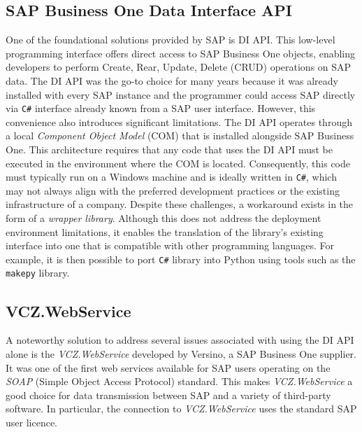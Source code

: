 \subsection{SAP Business One Data Interface API}
\label{subsec:sap-b1-di-api}

One of the foundational solutions provided by SAP is \ac{DI API}.
This low-level programming interface offers direct access to SAP Business One objects, enabling developers to perform Create, Rear, Update, Delete (\ac{CRUD}) operations on SAP data. 
The \ac{DI API} was the go-to choice for many years because it was already installed with every SAP instance and the programmer could access SAP directly via \texttt{C\#} interface already known from a SAP user interface.
However, this convenience also introduces significant limitations.
The \ac{DI API} operates through a local \textit{Component Object Model} (COM) that is installed alongside SAP Business One.
This architecture requires that any code that uses the DI API must be executed in the environment where the COM is located.
Consequently, this code must typically run on a Windows machine and is ideally written in \texttt{C\#}, which may not always align with the preferred development practices or the existing infrastructure of a company.
Despite these challenges, a workaround exists in the form of a \textit{wrapper library}.
Although this does not address the deployment environment limitations, it enables the translation of the library's existing interface into one that is compatible with other programming languages.
For example, it is then possible to port \texttt{C\#} library into Python using tools such as the \texttt{makepy} library.


\subsection{VCZ.WebService}
A noteworthy solution to address several issues associated with using the \ac{DI API} alone  is the \textit{VCZ.WebService} developed by Versino, a SAP Business One supplier. 
It was one of the first web services available for SAP users operating on the \textit{SOAP} (Simple Object Access Protocol) standard. 
This makes \textit{VCZ.WebService} a good choice for data transmission between SAP and a variety of third-party software.
In particular, the connection to \textit{VCZ.WebService} uses the standard SAP user licence.

